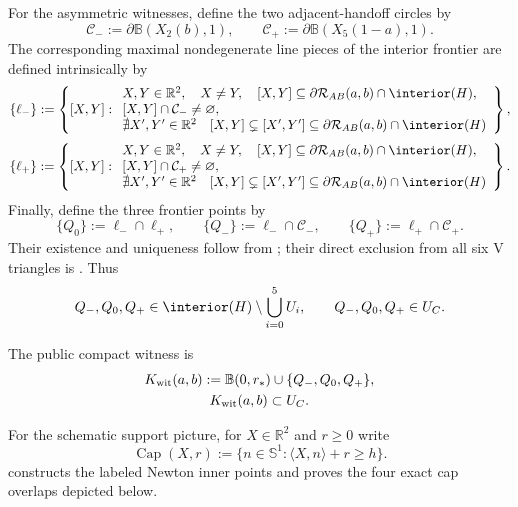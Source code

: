 For the asymmetric witnesses, define the two adjacent-handoff circles by
\[
 \mathcal C_-:=\partial\mathbb B(X_2(b),1),
 \qquad
 \mathcal C_+:=\partial\mathbb B(X_5(1-a),1).
\]
The corresponding maximal nondegenerate line pieces of the interior
frontier are defined intrinsically by
\[
 \{\ell_-\}:=
 \left\{
 [X,Y]:
 \begin{array}{l}
 X,Y\in\mathbb R^2,\quad X\ne Y,\quad
 [X,Y]\subseteq
 \partial\mathcal R_{AB}(a,b)\cap\interior(H),\\
 {}[X,Y]\cap\mathcal C_-\ne\varnothing,\\
 \nexists X',Y'\in\mathbb R^2\quad
 {}[X,Y]\subsetneq[X',Y']
 \subseteq\partial\mathcal R_{AB}(a,b)\cap\interior(H)
 \end{array}
 \right\},
\]
\[
 \{\ell_+\}:=
 \left\{
 [X,Y]:
 \begin{array}{l}
 X,Y\in\mathbb R^2,\quad X\ne Y,\quad
 [X,Y]\subseteq
 \partial\mathcal R_{AB}(a,b)\cap\interior(H),\\
 {}[X,Y]\cap\mathcal C_+\ne\varnothing,\\
 \nexists X',Y'\in\mathbb R^2\quad
 {}[X,Y]\subsetneq[X',Y']
 \subseteq\partial\mathcal R_{AB}(a,b)\cap\interior(H)
 \end{array}
 \right\}.
\]
Finally, define the three frontier points by
\[
 \{Q_0\}:=\ell_-\cap\ell_+,
 \qquad
 \{Q_-\}:=\ell_-\cap\mathcal C_-,
 \qquad
 \{Q_+\}:=\ell_+\cap\mathcal C_+.
\]
Their existence and uniqueness follow from
; their direct exclusion
from all six V triangles is .  Thus
\begin{equation}
 Q_-,Q_0,Q_+
 \in\interior(H)\setminus\bigcup_{i=0}^5U_i,
 \qquad
 Q_-,Q_0,Q_+\in U_C.
 \label{eq:reader-forced-asymmetric}
\end{equation}

The public compact witness is
\begin{equation}
 \begin{gathered}
 K_{\rm wit}(a,b):=
 \mathbb B(0,r_\ast)\cup\{Q_-,Q_0,Q_+\},\\
 K_{\rm wit}(a,b)\subset U_C.
 \end{gathered}
 \label{eq:reader-witness-set}
\end{equation}



For the schematic support picture, for $X\in\mathbb R^2$ and $r\ge0$ write
\[
 \operatorname{Cap}(X,r)
 :=\{n\in\mathbb S^1:\langle X,n\rangle+r\ge h\}.
\]
 constructs the labeled Newton inner points and proves
the four exact cap overlaps depicted below.

